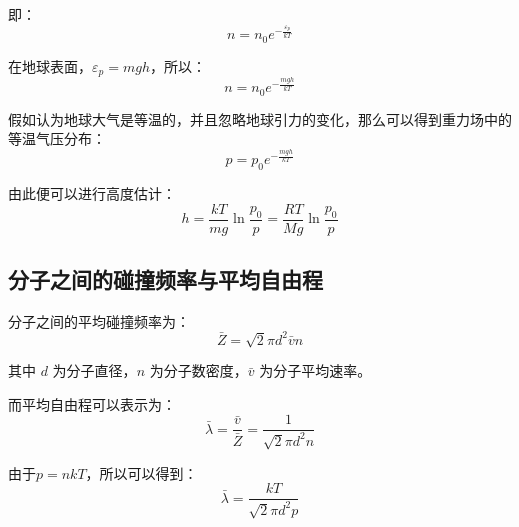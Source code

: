 \documentclass[10pt]{ctexart}
\begin{document}
即：
$$
    n = n_0 e^{-\frac{\varepsilon_p}{k T}}
$$

在地球表面，$\varepsilon_p = mgh$，所以：
$$
    n = n_0 e^{-\frac{mgh}{k T}}
$$

假如认为地球大气是等温的，并且忽略地球引力的变化，那么可以得到重力场中的等温气压分布：
$$
    p = p_0 e^{-\frac{mgh}{k T}}
$$

由此便可以进行高度估计：
$$
    h = \frac{k T}{m g} \ln \frac{p_0}{p} = \frac{R T}{M g} \ln \frac{p_0}{p}
$$

\subsection{分子之间的碰撞频率与平均自由程}
\label{subsec:分子之间的碰撞频率与平均自由程}

分子之间的平均碰撞频率为：
$$
    \bar{Z} = \sqrt{2} \pi d^2 \bar{v} n
$$

其中 $d$ 为分子直径，$n$ 为分子数密度，$\bar{v}$ 为分子平均速率。

而平均自由程可以表示为：
$$
    \bar{\lambda} = \frac{\bar{v}}{\bar{Z}} = \frac{1}{\sqrt{2}\pi d^2 n}
$$

由于$p = nkT$，所以可以得到：
$$
    \bar{\lambda} = \frac{kT}{\sqrt{2}\pi d^2 p}
$$
\end{document}
